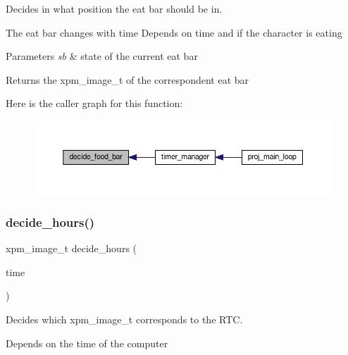 Decides in what position the eat bar should be in. 

The eat bar changes with time Depends on time and if the character is eating


\begin{DoxyParams}{Parameters}
{\em sb} & state of the current eat bar\\
\hline
\end{DoxyParams}
\begin{DoxyReturn}{Returns}
the xpm\+\_\+image\+\_\+t of the correspondent eat bar 
\end{DoxyReturn}
Here is the caller graph for this function\+:
\nopagebreak
\begin{figure}[H]
\begin{center}
\leavevmode
\includegraphics[width=350pt]{group__loading__xpms_ga2cdb6cdede927ad5a784d34d47577acf_icgraph}
\end{center}
\end{figure}
\mbox{\label{group__loading__xpms_ga62a40150916b92b39ae83d800e3612f1}} 
\subsubsection{\texorpdfstring{decide\+\_\+hours()}{decide\_hours()}}
{\footnotesize\ttfamily xpm\+\_\+image\+\_\+t decide\+\_\+hours (\begin{DoxyParamCaption}\item[{\hyperlink{structrtc__time}{rtc\+\_\+time} $\ast$}]{time }\end{DoxyParamCaption})}



Decides which xpm\+\_\+image\+\_\+t corresponds to the R\+TC. 

Depends on the time of the computer


